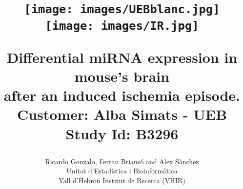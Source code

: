 \documentclass{article}
\renewcommand*\footnoterule{}
\begin{document}
\title{\begin{figure}[htbp]
       \centering
       \texttt{[image: images/UEBblanc.jpg]}
       \texttt{[image: images/IR.jpg]}
       \end{figure}
       \vspace{1cm}
       Differential miRNA expression in mouse's brain\\
       after an induced ischemia episode.\\
       {\normalsize Customer: Alba Simats - UEB Study Id: B3296
        \footnotetext{\footnoterule{\tiny\textcolor{violet}{VHIR-UEB-FOR-013v.01}}}\\
       }}\\
\\
\\
\author{Ricardo Gonzalo, Ferran Brians\'{o} and Alex S\`{a}nchez \\ 
        Unitat d'Estad\'{i}stica i Bioinform\`{a}tica \\
        Vall d'Hebron Institut de Recerca (VHIR)} \\




\maketitle

\newpage
\tableofcontents
\listoffigures
\listoftables

 





\end{document}
